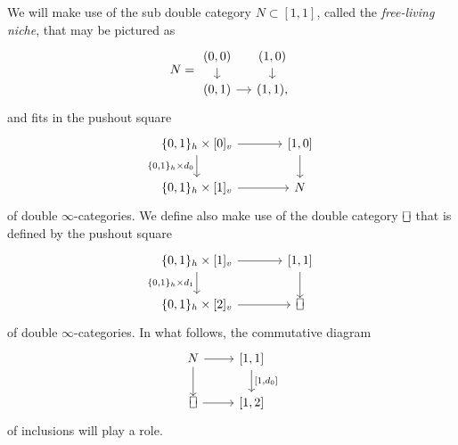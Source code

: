 \documentclass[a4paper, 11pt]{amsart}
\numberwithin{theorem}{section}
\theoremstyle{definition}
\newcommand*{\vrectangle}{{\ooalign{\lower.3ex\hbox{$\sqcup$}\cr\raise.4ex\hbox{$\sqcap$}}}}
\begin{document}
\begin{notation}
	We will make use of the sub double category $N\subset [1,1]$, called the \textit{free-living niche}, that may be pictured as 
	\[ 
		 N= \begin{tikzcd}[column sep = small, row sep =small]
			(0,0) \arrow[d] & (1,0)\arrow[d] \\
			(0,1) \arrow[r] & (1,1),
		\end{tikzcd}
	\] and fits in the pushout square
	\[ 
	\begin{tikzcd}[column sep = large]
		\{0,1\}_h \times [0]_v \arrow[d, "{\{0,1\}_h \times d_0}"']\arrow[r]& {[1,0]}\arrow[d] \\
		\{0,1\}_h \times [1]_v \arrow[r] & N
	\end{tikzcd}
	\]
	of double $\infty$-categories. 
	We define also make use of the double category $\vrectangle$ that is defined by the pushout square 
	\[ 
	\begin{tikzcd}[column sep = large]
		\{0,1\}_h \times [1]_v \arrow[d, "{\{0,1\}_h \times d_1}"']\arrow[r] & {[1,1]}\arrow[d] \\
		\{0,1\}_h \times [2]_v \arrow[r] & \vrectangle
	\end{tikzcd}
	\]
	of double $\infty$-categories.  In what follows, the commutative diagram
	\[
		\begin{tikzcd}
			N \arrow[d] \arrow[r] & {[1,1]} \arrow[d, "{[1,d_0]}"] \\
			\vrectangle \arrow[r] & {[1,2]}
		\end{tikzcd}
	\]
	of inclusions will play a role.
\end{notation}
\end{document}
